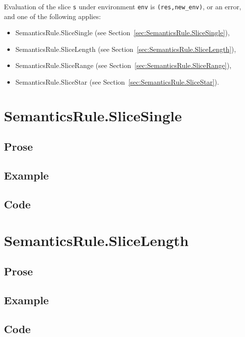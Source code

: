 \documentclass{book}
\begin{document}
Evaluation of the slice \texttt{s} under environment \texttt{env} is
\texttt{(res,new\_env)}, or an error, and one of the following applies:
\begin{itemize}
\item SemanticsRule.SliceSingle (see Section~\ref{sec:SemanticsRule.SliceSingle}),
\item SemanticsRule.SliceLength (see Section~\ref{sec:SemanticsRule.SliceLength}),
\item SemanticsRule.SliceRange (see Section~\ref{sec:SemanticsRule.SliceRange}),
\item SemanticsRule.SliceStar (see Section~\ref{sec:SemanticsRule.SliceStar}).
\end{itemize}

\section{SemanticsRule.SliceSingle \label{sec:SemanticsRule.SliceSingle}}

  \subsection{Prose}

  \subsection{Example}

  \subsection{Code}

\section{SemanticsRule.SliceLength \label{sec:SemanticsRule.SliceLength}}

  \subsection{Prose}

  \subsection{Example}

  \subsection{Code}
\end{document}
